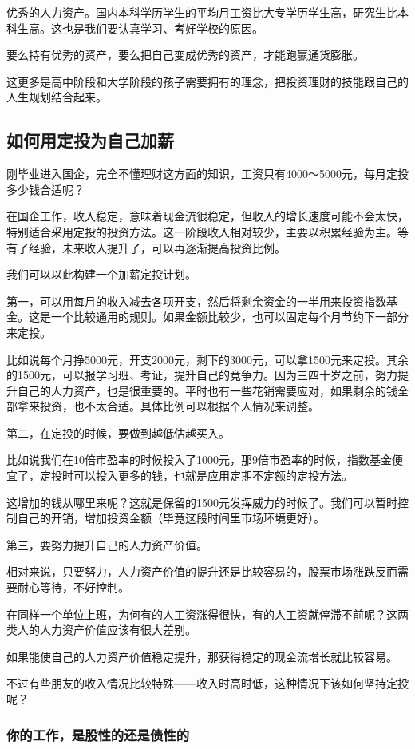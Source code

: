优秀的人力资产。国内本科学历学生的平均月工资比大专学历学生高，研究生比本科生高。这也是我们要认真学习、考好学校的原因。

要么持有优秀的资产，要么把自己变成优秀的资产，才能跑赢通货膨胀。

这更多是高中阶段和大学阶段的孩子需要拥有的理念，把投资理财的技能跟自己的人生规划结合起来。

\subsection{如何用定投为自己加薪}
{\kaishu 刚毕业进入国企，完全不懂理财这方面的知识，工资只有4000～5000元，每月定投多少钱合适呢？}

在国企工作，收入稳定，意味着现金流很稳定，但收入的增长速度可能不会太快，特别适合采用定投的投资方法。这一阶段收入相对较少，主要以积累经验为主。等有了经验，未来收入提升了，可以再逐渐提高投资比例。

我们可以以此构建一个加薪定投计划。

第一，可以用每月的收入减去各项开支，然后将剩余资金的一半用来投资指数基金。这是一个比较通用的规则。如果金额比较少，也可以固定每个月节约下一部分来定投。

比如说每个月挣5000元，开支2000元，剩下的3000元，可以拿1500元来定投。其余的1500元，可以报学习班、考证，提升自己的竞争力。因为三四十岁之前，努力提升自己的人力资产，也是很重要的。平时也有一些花销需要应对，如果剩余的钱全部拿来投资，也不太合适。具体比例可以根据个人情况来调整。

第二，在定投的时候，要做到越低估越买入。

比如说我们在10倍市盈率的时候投入了1000元，那9倍市盈率的时候，指数基金便宜了，定投时可以投入更多的钱，也就是应用定期不定额的定投方法。

这增加的钱从哪里来呢？这就是保留的1500元发挥威力的时候了。我们可以暂时控制自己的开销，增加投资金额（毕竟这段时间里市场环境更好）。

第三，要努力提升自己的人力资产价值。

相对来说，只要努力，人力资产价值的提升还是比较容易的，股票市场涨跌反而需要耐心等待，不好控制。

在同样一个单位上班，为何有的人工资涨得很快，有的人工资就停滞不前呢？这两类人的人力资产价值应该有很大差别。

如果能使自己的人力资产价值稳定提升，那获得稳定的现金流增长就比较容易。

不过有些朋友的收入情况比较特殊——收入时高时低，这种情况下该如何坚持定投呢？

\subsubsection{你的工作，是股性的还是债性的}

